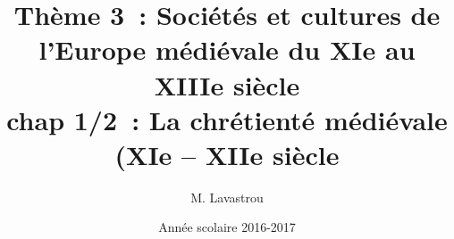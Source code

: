 \documentclass[C]{beamer}
\title{Thème 3~: Sociétés et cultures de l'Europe médiévale du XIe au XIIIe siècle\\ chap 1/2~: La chrétienté médiévale (XIe -- XIIe siècle}}
\author{M. Lavastrou}
\institute{Classes de seconde -- Lycée Jean Lurçat}
\date{Année scolaire 2016-2017}
\begin{document}
	\begin{frame}
	\titlepage
	\end{frame}
	
\end{document}
